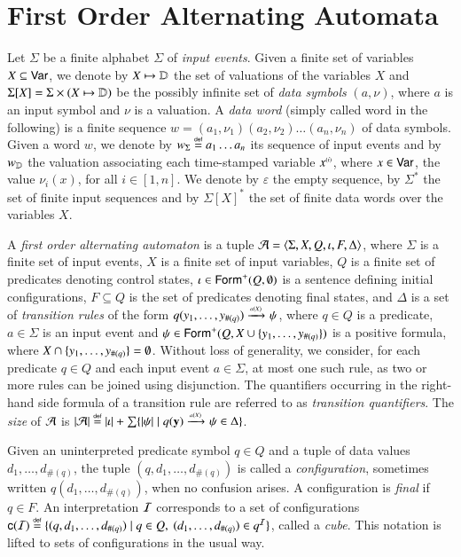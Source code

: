 \section{First Order Alternating Automata}

Let $\Sigma$ be a finite alphabet $\Sigma$ of \emph{input
  events}. Given a finite set of variables $X \subseteq \mathsf{Var}$, we
denote by $X \mapsto \mathbb{D}$ the set of valuations of the variables $X$
and $\Sigma[X] = \Sigma \times (X \mapsto \mathbb{D})$ be the possibly
infinite set of \emph{data symbols} $(a,\nu)$, where $a$ is an input
symbol and $\nu$ is a valuation. A \emph{data word} (simply called
word in the following) is a finite sequence $w=(a_1,\nu_1)(a_2,\nu_2)
\ldots (a_n,\nu_n)$ of data symbols. Given a word $w$, we denote by
${w}_\Sigma \stackrel{\scriptscriptstyle{\mathsf{def}}}{=} a_1\ldots a_n$ its sequence of input events and by
${w}_{\mathbb{D}}$ the valuation associating each time-stamped variable
${x}^{\scriptscriptstyle{({i})}}$, where $x \in \mathsf{Var}$, the value $\nu_i(x)$, for all
$i\in[1,n]$. We denote by $\varepsilon$ the empty sequence, by
$\Sigma^*$ the set of finite input sequences and by $\Sigma[X]^*$ the
set of finite data words over the variables $X$.

A \emph{first order alternating automaton} is a tuple $\mathcal{A} =
\langle \Sigma,X,Q,\iota,F,\Delta \rangle$, where $\Sigma$ is a finite set of
input events, $X$ is a finite set of input variables, $Q$ is a finite
set of predicates denoting control states, $\iota \in
\mathsf{Form}^+(Q,\emptyset)$ is a sentence defining initial configurations,
$F \subseteq Q$ is the set of predicates denoting final states, and
$\Delta$ is a set of \emph{transition rules} of the form
\(q(y_1,\ldots,y_{\#(q)}) \xrightarrow{{\scriptscriptstyle a(X)}}_{{\scriptstyle }} \psi\), where $q \in Q$ is a
predicate, $a \in \Sigma$ is an input event and $\psi \in
\mathsf{Form}^+(Q,X \cup \{ y_1,\ldots,y_{\#(q)} \})$ is a positive formula,
where $X \cap \{ y_1,\ldots,y_{\#(q)} \} = \emptyset$.  Without loss
of generality, we consider, for each predicate $q \in Q$ and each
input event $a \in \Sigma$, at most one such rule, as two or more
rules can be joined using disjunction. The quantifiers occurring in
the right-hand side formula of a transition rule are referred to as
\emph{transition quantifiers}. The \emph{size} of $\mathcal{A}$ is ${|{\mathcal{A}}|}
\stackrel{\scriptscriptstyle{\mathsf{def}}}{=} {|{\iota}|} + \sum \{ {|{\psi}|} \mid q(\mathbf y)
  \xrightarrow{{\scriptscriptstyle a(X)}}_{{\scriptstyle }} \psi \in \Delta \}$.

Given an uninterpreted predicate symbol $q \in Q$ and a tuple of data
values $d_1,\ldots,d_{\#(q)}$, the tuple $(q, d_1,\ldots,d_{\#(q)})$
is called a \emph{configuration}, sometimes written
$q(d_1,\ldots,d_{\#(q)})$, when no confusion arises. A configuration
is \emph{final} if $q \in F$. An interpretation $\mathcal{I}$ corresponds to a
set of configurations $\mathsf{c}({\mathcal{I}}) \stackrel{\scriptscriptstyle{\mathsf{def}}}{=} \{ (q, d_1,\ldots,d_{\#(q)})
  \mid q \in Q,~ (d_1,\ldots,d_{\#(q)}) \in q^{\mathcal{I}} \}$, called a
\emph{cube}. This notation is lifted to sets of configurations in the
usual way.

